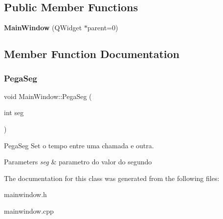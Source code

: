 \subsection*{Public Member Functions}
\begin{DoxyCompactItemize}
\item 
\mbox{\label{class_main_window_a8b244be8b7b7db1b08de2a2acb9409db}} 
{\bfseries Main\+Window} (Q\+Widget $\ast$parent=0)
\end{DoxyCompactItemize}


\subsection{Member Function Documentation}
\mbox{\label{class_main_window_a4fa75cec1aa7eeca94028dbcb58bbe14}} 
\subsubsection{\texorpdfstring{Pega\+Seg}{PegaSeg}}
{\footnotesize\ttfamily void Main\+Window\+::\+Pega\+Seg (\begin{DoxyParamCaption}\item[{int}]{seg }\end{DoxyParamCaption})\hspace{0.3cm}{\ttfamily [slot]}}



Pega\+Seg Set o tempo entre uma chamada e outra. 


\begin{DoxyParams}{Parameters}
{\em seg} & parametro do valor do segundo \\
\hline
\end{DoxyParams}


The documentation for this class was generated from the following files\+:\begin{DoxyCompactItemize}
\item 
mainwindow.\+h\item 
mainwindow.\+cpp\end{DoxyCompactItemize}
